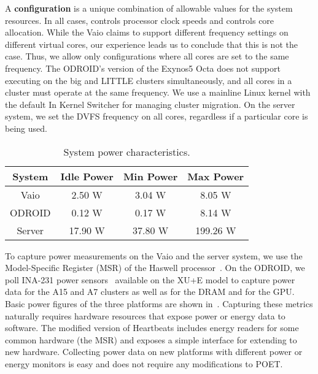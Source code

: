 A \textbf{configuration} is a unique combination of allowable values for the system resources.
In all cases,  controls processor clock speeds and  controls core allocation.
While the Vaio claims to support different frequency settings on different virtual cores, our experience leads us to conclude that this is not the case.
Thus, we allow only configurations where all cores are set to the same frequency.
The ODROID's version of the Exynos5 Octa does not support executing on the big and LITTLE clusters simultaneously, and all cores in a cluster must operate at the same frequency.
We use a mainline Linux kernel with the default In Kernel Switcher for managing cluster migration.
On the server system, we set the DVFS frequency on all cores, regardless if a particular core is being used.

\begin{table}[t]
\centering
\caption{System power characteristics.}
\begin{tabular}{cccc}
  \textbf{System} & \textbf{Idle Power} & \textbf{Min Power} & \textbf{Max Power} \\
  \hline
  \hline
  Vaio   & 2.50 W  & 3.04 W  & 8.05 W \\
  ODROID & 0.12 W  & 0.17 W  & 8.14 W \\
  Server & 17.90 W & 37.80 W & 199.26 W \\
  \hline
  \hline
\end{tabular}
\label{tbl:poet-power}
\end{table}

To capture power measurements on the Vaio and the server system, we use the Model-Specific Register (MSR) of the Haswell processor~\cite{SandyBridge}.
On the ODROID, we poll INA-231 power sensors~\cite{ina231} available on the XU+E model to capture power data for the A15 and A7 clusters as well as for the DRAM and for the GPU.
Basic power figures of the three platforms are shown in~.
Capturing these metrics naturally requires hardware resources that expose power or energy data to software.
The modified version of Heartbeats includes energy readers for some common hardware (\eg the MSR) and exposes a simple interface for extending to new hardware.
Collecting power data on new platforms with different power or energy monitors is easy and does not require any modifications to POET.

